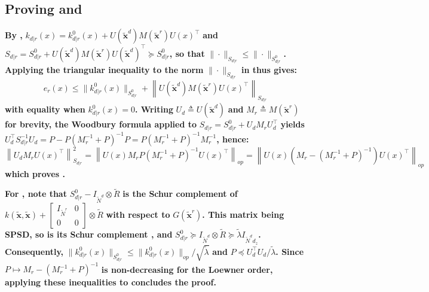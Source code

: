 \documentclass[preprint]{elsarticle}
\begin{document}
\subsection[]{Proving  and }\label{sec:split_bound_proof}

\textbf{By ,} $k_{d|r}(x)=k^0_{d|r}(x)+U(\tilde{\mathbf{x}}^d)M(\tilde{\mathbf{x}}^r)U(x)^\top$ \textbf{and} $S_{d|r}=S^0_{d|r}+U(\tilde{\mathbf{x}}^d)M(\tilde{\mathbf{x}}^r)U(\tilde{\mathbf{x}}^d)^\top\succeq S^0_{d|r}$\textbf{, so that} $\|\cdot\|_{S_{d|r}}\leq\|\cdot\|_{S^0_{d|r}}$\textbf{. Applying the triangular inequality to the norm} $\|\cdot\|_{S_{d|r}}$ \textbf{in  thus gives:}
\begin{equation*}
    e_r(x)\leq\|k^0_{d|r}(x)\|_{S^0_{d|r}}+\left\|U(\tilde{\mathbf{x}}^d)M(\tilde{\mathbf{x}}^r)U(x)^\top\right\|_{S_{d|r}}
\end{equation*}
\textbf{with equality when} $k^0_{d|r}(x)=0$\textbf{. Writing} $U_d\triangleq U(\tilde{\mathbf{x}}^d)$ \textbf{and} $M_r\triangleq M(\tilde{\mathbf{x}}^r)$ \textbf{for brevity, the Woodbury formula \cite{bib:matrix-cookbook} applied to} $S_{d|r}=S^0_{d|r}+U_dM_rU_d^\top$ \textbf{yields} $U_d^\top S_{d|r}^{-1}U_d=P-P(M_r^{-1}+P)^{-1}P=P(M_r^{-1}+P)^{-1}M_r^{-1}$\textbf{, hence:}
\begin{equation*}
    \left\|U_dM_rU(x)^\top\right\|_{S_{d|r}}^2=\left\|U(x)M_rP(M_r^{-1}+P)^{-1}U(x)^\top\right\|_{op}=\left\|U(x)\left(M_r-(M_r^{-1}+P)^{-1}\right)U(x)^\top\right\|_{op}
\end{equation*}
\textbf{which proves .}

\textbf{For , note that} $S^0_{d|r}-I_{\tilde{N}^d}\otimes\tilde{R}$ \textbf{is the Schur complement of} $k(\tilde{\mathbf{x}},\tilde{\mathbf{x}})+\begin{bmatrix}I_{\tilde{N}^r}&0\\0&0\end{bmatrix}\otimes\tilde{R}$ \textbf{with respect to} $G(\tilde{\mathbf{x}}^r)$\textbf{. This matrix being SPSD, so is its Schur complement \cite{bib:matrix-analysis}, and} $S^0_{d|r}\succeq I_{\tilde{N}^d}\otimes\tilde{R}\succeq\tilde{\lambda}I_{\tilde{N}^dd_z}$\textbf{. Consequently,} $\|k^0_{d|r}(x)\|_{S^0_{d|r}}\leq\|k^0_{d|r}(x)\|_{op}/\sqrt{\tilde{\lambda}}$ \textbf{and} $P\preceq U_d^\top U_d/\tilde{\lambda}$\textbf{. Since} $P\mapsto M_r-(M_r^{-1}+P)^{-1}$ \textbf{is non-decreasing for the Loewner order, applying these inequalities to  concludes the proof.}
\end{document}
